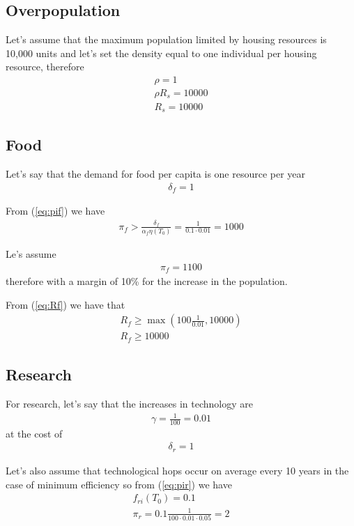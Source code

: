\documentclass[a4paper,twoside]{article}
\begin{document}
\subsection{Overpopulation}

Let's assume that the maximum population limited by housing resources is 10,000 units and let's set the density equal to one individual per housing resource, therefore
\begin{align*}
	\rho = 1
	\\
	\rho R_s = 10000
	\\
	R_s = 10000
\end{align*}

\subsection{Food}

Let's say that the demand for food per capita is one resource per year
\begin{align*}
	\delta_f = 1
\end{align*}

From (\ref{eq:pif}) we have
\begin{align*}
	\pi_f > \frac{\delta_f}{ \alpha_f \eta(T_0)} = \frac{1}{0.1 \cdot 0.01} = 1000
\end{align*}

Le's assume
\begin{align*}
	\pi_f = 1100
\end{align*}
therefore with a margin of 10\% for the increase in the population.

From (\ref{eq:Rf}) we have that
\begin{align*}
	R_f \ge \max \left(100 \frac{1}{0.01}, 10000 \right)
	\\
	R_f \ge 10000
\end{align*}

\subsection{Research}

For research, let's say that the increases in technology are
\begin{align*}
	\gamma = \frac{1}{100} = 0.01
\end{align*}
at the cost of
\begin{align*}
	\delta_r = 1
\end{align*}

Let's also assume that technological hops occur on average every 10 years in the case of minimum efficiency so from (\ref{eq:pir}) we have
\begin{align*}
	f_{ri}(T_0) = 0.1
	\\
	\pi_r = 0.1 \frac{1}{100 \cdot 0.01 \cdot 0.05} = 2
\end{align*}
\end{document}
